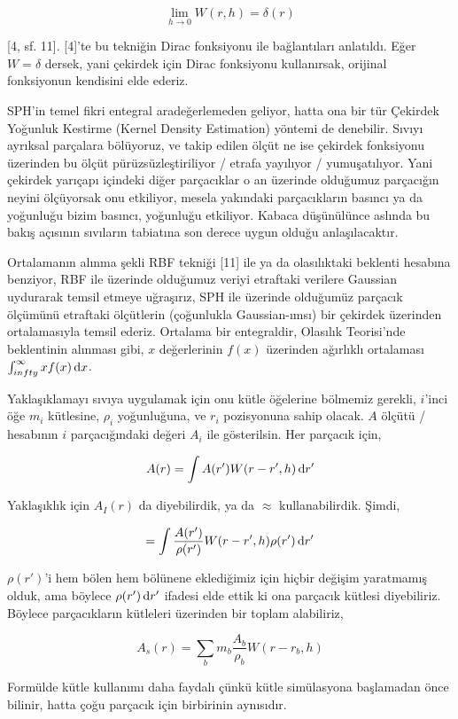\documentclass[12pt,fleqn]{article}\usepackage{../../common}
\begin{document}
$$
\lim_{h \to 0} W(r,h) = \delta(r)
$$

[4, sf. 11]. [4]'te bu tekniğin Dirac fonksiyonu ile bağlantıları
anlatıldı. Eğer $W = \delta$ dersek, yani çekirdek için Dirac fonksiyonu
kullanırsak, orijinal fonksiyonun kendisini elde ederiz.

SPH'in temel fikri entegral aradeğerlemeden geliyor, hatta ona bir tür Çekirdek
Yoğunluk Kestirme (Kernel Density Estimation) yöntemi de denebilir. Sıvıyı
ayrıksal parçalara bölüyoruz, ve takip edilen ölçüt ne ise çekirdek fonksiyonu
üzerinden bu ölçüt pürüzsüzleştiriliyor / etrafa yayılıyor / yumuşatılıyor. Yani
çekirdek yarıçapı içindeki diğer parçacıklar o an üzerinde olduğumuz parçacığın
neyini ölçüyorsak onu etkiliyor, mesela yakındaki parçacıkların basıncı ya da
yoğunluğu bizim basıncı, yoğunluğu etkiliyor. Kabaca düşünülünce aslında bu
bakış açısının sıvıların tabiatına son derece uygun olduğu anlaşılacaktır.

Ortalamanın alınma şekli RBF tekniği [11] ile ya da olasılıktaki beklenti
hesabına benziyor, RBF ile üzerinde olduğumuz veriyi etraftaki verilere Gaussian
uydurarak temsil etmeye uğraşırız, SPH ile üzerinde olduğumüz parçacık ölçümünü
etraftaki ölçütlerin (çoğunlukla Gaussian-ımsı) bir çekirdek üzerinden
ortalamasıyla temsil ederiz. Ortalama bir entegraldir, Olasılık Teorisi'nde
beklentinin alınması gibi, $x$ değerlerinin $f(x)$ üzerinden ağırlıklı
ortalaması $\int_{\-infty}^{\infty} x f(x) \,\mathrm{d} x$.

Yaklaşıklamayı sıvıya uygulamak için onu kütle öğelerine bölmemiz gerekli,
$i$'inci öğe $m_i$ kütlesine, $\rho_i$ yoğunluğuna, ve $r_i$ pozisyonuna sahip
olacak. $A$ ölçütü / hesabının $i$ parçacığındaki değeri $A_i$ ile
gösterilsin. Her parçacık için,

$$
A(r) = \int A(r') W(r-r',h) \,\mathrm{d} r'
$$

Yaklaşıklık için $A_I(r)$ da diyebilirdik, ya da $\approx$
kullanabilirdik. Şimdi,

$$
 = \int \frac{A(r')}{\rho(r')} W(r-r',h) \rho(r') \,\mathrm{d} r'
$$

$\rho(r')$'i hem bölen hem bölünene eklediğimiz için hiçbir değişim yaratmamış
olduk, ama böylece $\rho(r') \,\mathrm{d} r'$ ifadesi elde ettik ki ona parçacık kütlesi
diyebiliriz. Böylece parçacıkların kütleleri üzerinden bir toplam alabiliriz,

$$
A_s(r) = \sum_b m_b \frac{A_b}{\rho_b} W(r-r_b, h)
$$

Formülde kütle kullanımı daha faydalı çünkü kütle simülasyona başlamadan önce
bilinir, hatta çoğu parçacık için birbirinin aynısıdır. 
\end{document}
